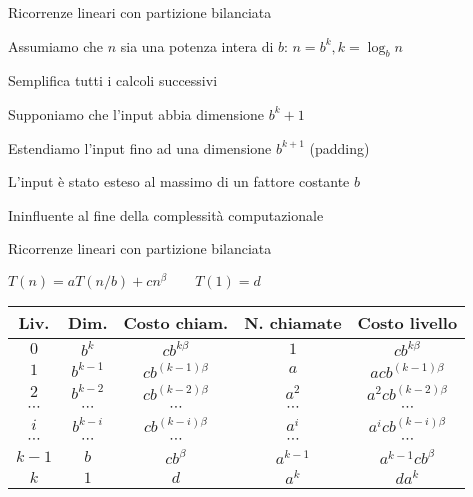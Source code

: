 \begin{frame}{Ricorrenze lineari con partizione bilanciata}

\begin{myboxtitle}[Assunzioni]
Assumiamo che $n$ sia una potenza intera di $b$: $n=b^k, k= \log_b n$
\end{myboxtitle}

\begin{myboxtitle}
Semplifica tutti i calcoli successivi
\end{myboxtitle}

\begin{myboxtitle}
\BI
\item Supponiamo che l'input abbia dimensione $b^k+1$
\item Estendiamo l'input fino ad una dimensione $b^{k+1}$ (\alert{padding})
\item L'input è stato esteso al massimo di un fattore costante $b$
\item Ininfluente al fine della complessità computazionale
\EI
\end{myboxtitle}

\end{frame}


\begin{frame}{Ricorrenze lineari con partizione bilanciata}

\vspace{-6pt}
\begin{mybox}
$T(n) = aT(n/b) + cn^\beta \qquad T(1) = d$
\end{mybox}	
\bgroup
\begin{center}
\def\arraystretch{1.1}
\begin{tabular}{|c|c|c|c|c|}
\hline
\textbf{Liv.} & \textbf{Dim.} & \textbf{Costo chiam.} & \textbf{N. chiamate} & \textbf{Costo livello} \\\hline
$0$ & $b^k$ & $cb^{k\beta}$  & $1$ & $cb^{k\beta}$ \\
\hline
$1$ & $b^{k-1}$ & $cb^{(k-1)\beta}$ & $a$ & $acb^{(k-1)\beta}$ \\
\hline
$2$ & $b^{k-2}$ & $cb^{(k-2)\beta}$& $a^2$  & $a^2cb^{(k-2)\beta}$ \\
\hline
$\cdots$ & $\cdots$ & $\cdots$ & $\cdots$ & $\cdots$ \\
\hline
$i$  & $b^{k-i}$ & $cb^{(k-i)\beta}$ & $a^i$& $a^icb^{(k-i)\beta}$ \\
\hline
$\cdots$ & $\cdots$ & $\cdots$ & $\cdots$ & $\cdots$ \\
\hline
$k-1$  & $b$ & $cb^\beta$ & $a^{k-1}$ & $a^{k-1}cb^{\beta}$ \\
\hline
$k$ & $1$ & $d$ & $a^k$ &$da^k$ \\
\hline
\end{tabular}
\end{center}
\egroup

\end{frame}

